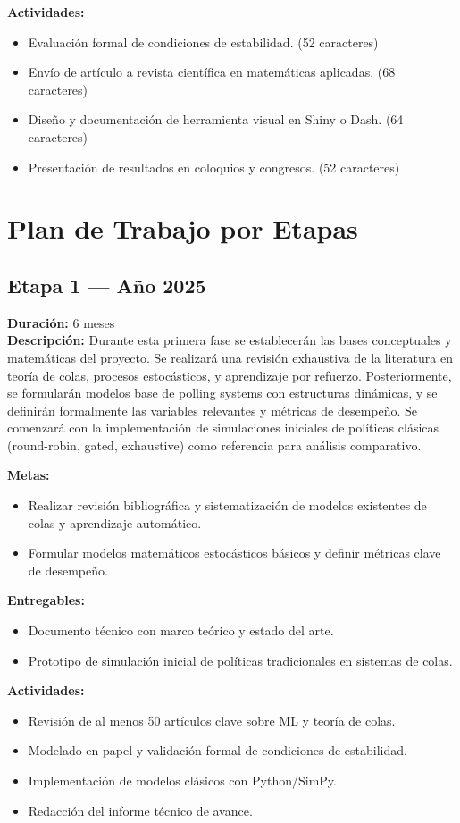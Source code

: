 \documentclass[12pt]{article}
\begin{document}
\textbf{Actividades:}
\begin{itemize}
  \item Evaluación formal de condiciones de estabilidad. (52 caracteres)
  \item Envío de artículo a revista científica en matemáticas aplicadas. (68 caracteres)
  \item Diseño y documentación de herramienta visual en Shiny o Dash. (64 caracteres)
  \item Presentación de resultados en coloquios y congresos. (52 caracteres)
\end{itemize}
\section{Plan de Trabajo por Etapas}

\subsection*{Etapa 1 — Año 2025}
\textbf{Duración:} 6 meses\\
\textbf{Descripción:} Durante esta primera fase se establecerán las bases conceptuales y matemáticas del proyecto. Se realizará una revisión exhaustiva de la literatura en teoría de colas, procesos estocásticos, y aprendizaje por refuerzo. Posteriormente, se formularán modelos base de polling systems con estructuras dinámicas, y se definirán formalmente las variables relevantes y métricas de desempeño. Se comenzará con la implementación de simulaciones iniciales de políticas clásicas (round-robin, gated, exhaustive) como referencia para análisis comparativo.

\textbf{Metas:}
\begin{itemize}
  \item Realizar revisión bibliográfica y sistematización de modelos existentes de colas y aprendizaje automático.
  \item Formular modelos matemáticos estocásticos básicos y definir métricas clave de desempeño.
\end{itemize}

\textbf{Entregables:}
\begin{itemize}
  \item Documento técnico con marco teórico y estado del arte.
  \item Prototipo de simulación inicial de políticas tradicionales en sistemas de colas.
\end{itemize}

\textbf{Actividades:}
\begin{itemize}
  \item Revisión de al menos 50 artículos clave sobre ML y teoría de colas.
  \item Modelado en papel y validación formal de condiciones de estabilidad.
  \item Implementación de modelos clásicos con Python/SimPy.
  \item Redacción del informe técnico de avance.
\end{itemize}
\end{document}

